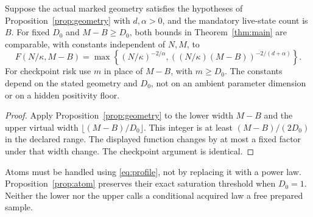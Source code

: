 \begin{corollary}\label{cor:order}
Suppose the actual marked geometry satisfies the hypotheses of Proposition~\ref{prop:geometry} with $d,\alpha>0$, and the mandatory live-state count is $B$. For fixed $D_0$ and $M-B\ge D_0$, both bounds in Theorem~\ref{thm:main} are comparable, with constants independent of $N,M$, to
\begin{equation}\label{eq:regular-rate}
 F(N/\kappa,M-B)
 =\max\left\{(N/\kappa)^{-2/\alpha},
       ((N/\kappa)(M-B))^{-2/(d+\alpha)}\right\}.
\end{equation}
For checkpoint risk use $m$ in place of $M-B$, with $m\ge D_0$. The constants depend on the stated geometry and $D_0$, not on an ambient parameter dimension or on a hidden positivity floor.
\end{corollary}
\begin{proof}
Apply Proposition~\ref{prop:geometry} to the lower width $M-B$ and the upper virtual width $\lfloor(M-B)/D_0\rfloor$. This integer is at least $(M-B)/(2D_0)$ in the declared range. The displayed function changes by at most a fixed factor under that width change. The checkpoint argument is identical.
\end{proof}

Atoms must be handled using \eqref{eq:profile}, not by replacing it with a power law. Proposition~\ref{prop:atom} preserves their exact saturation threshold when $D_0=1$. Neither the lower nor the upper calls a conditional acquired law a free prepared sample.

